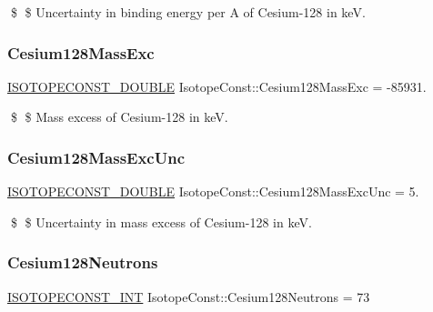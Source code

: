 \$ \$ Uncertainty in binding energy per A of Cesium-\/128 in keV. \mbox{\label{group___isotope_const-_cesium-_cs128_ga071bbfb8a9b33d02cd49e7a3ace6c4b7}} 
\subsubsection{\texorpdfstring{Cesium128\+Mass\+Exc}{Cesium128MassExc}}
{\footnotesize\ttfamily \mbox{\hyperlink{group___isotope_const-_macros_ga8f45a7272ce02c0b4c65c44636ed719a}{I\+S\+O\+T\+O\+P\+E\+C\+O\+N\+S\+T\+\_\+\+D\+O\+U\+B\+LE}} Isotope\+Const\+::\+Cesium128\+Mass\+Exc = -\/85931.}

\$ \$ Mass excess of Cesium-\/128 in keV. \mbox{\label{group___isotope_const-_cesium-_cs128_ga7b8ce959e998f0e368ba77e78680eef1}} 
\subsubsection{\texorpdfstring{Cesium128\+Mass\+Exc\+Unc}{Cesium128MassExcUnc}}
{\footnotesize\ttfamily \mbox{\hyperlink{group___isotope_const-_macros_ga8f45a7272ce02c0b4c65c44636ed719a}{I\+S\+O\+T\+O\+P\+E\+C\+O\+N\+S\+T\+\_\+\+D\+O\+U\+B\+LE}} Isotope\+Const\+::\+Cesium128\+Mass\+Exc\+Unc = 5.}

\$ \$ Uncertainty in mass excess of Cesium-\/128 in keV. \mbox{\label{group___isotope_const-_cesium-_cs128_gae0616036e51f03f08e8f8c6dda33b756}} 
\subsubsection{\texorpdfstring{Cesium128\+Neutrons}{Cesium128Neutrons}}
{\footnotesize\ttfamily \mbox{\hyperlink{group___isotope_const-_macros_ga5f18360b3e99483a35c32d789e62621c}{I\+S\+O\+T\+O\+P\+E\+C\+O\+N\+S\+T\+\_\+\+I\+NT}} Isotope\+Const\+::\+Cesium128\+Neutrons = 73}

